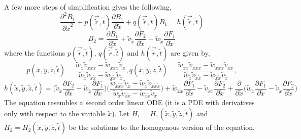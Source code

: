\documentclass{article}
\begin{document}
A few more steps of simplification gives the following,
\begin{equation} \label{eqn38}
\frac{\partial^2 B_1}{\partial \tilde{x}^2} + p(\vec{\tilde{r}}, \tilde{t}) \frac{\partial B_1}{\partial \tilde{x}} + q(\vec{\tilde{r}}, \tilde{t}) B_1 = h(\vec{\tilde{r}}, \tilde{t})
\end{equation}
\begin{equation} \label{eqn41}
B_2 = \frac{\partial B_1}{\partial \tilde{x}} + \tilde{v}_{\tilde{x}} \frac{\partial F_2}{\partial \tilde{x}} - \tilde{w}_{\tilde{x}} \frac{\partial F_1}{\partial \tilde{x}}
\end{equation}
where the functions $p(\vec{\tilde{r}}, \tilde{t})$, $q(\vec{\tilde{r}}, \tilde{t})$ and $h(\vec{\tilde{r}}, \tilde{t})$ are given by,
\begin{equation*}
p(\tilde{x}, \tilde{y}, \tilde{z}, \tilde{t}) = \frac{\tilde{w}_{\tilde{x}} \tilde{v}_{\tilde{x}\tilde{x}\tilde{x}} - \tilde{w}_{\tilde{x}\tilde{x}\tilde{x}} \tilde{v}_{\tilde{x}}}{\tilde{w}_{\tilde{x}}\tilde{v}_{\tilde{x}\tilde{x}}-\tilde{w}_{\tilde{x}\tilde{x}}\tilde{v}_{\tilde{x}}},
q(\tilde{x}, \tilde{y}, \tilde{z}, \tilde{t}) = \frac{\tilde{w}_{\tilde{x}\tilde{x}} \tilde{v}_{\tilde{x}\tilde{x}\tilde{x}} - \tilde{w}_{\tilde{x}\tilde{x}\tilde{x}} \tilde{v}_{\tilde{x}\tilde{x}}}{\tilde{w}_{\tilde{x}}\tilde{v}_{\tilde{x}\tilde{x}}-\tilde{w}_{\tilde{x}\tilde{x}}\tilde{v}_{\tilde{x}}},
\end{equation*}
\begin{equation*}
h(\tilde{x}, \tilde{y}, \tilde{z}, \tilde{t}) = \bigg(\tilde{v}_{\tilde{x}} \frac{\partial F_2}{\partial \tilde{x}} - \tilde{w}_{\tilde{x}} \frac{\partial F_1}{\partial \tilde{x}}\bigg)\bigg(\frac{\tilde{w}_{\tilde{x}\tilde{x}\tilde{x}}\tilde{v}_{\tilde{x}}-\tilde{w}_{\tilde{x}}\tilde{v}_{\tilde{x}\tilde{x}\tilde{x}}}{\tilde{w}_{\tilde{x}} \tilde{v}_{\tilde{x}\tilde{x}} - \tilde{w}_{\tilde{x}\tilde{x}}\tilde{v}_{\tilde{x}}}\bigg) + \tilde{w}_{\tilde{x}\tilde{x}} \frac{\partial F_1}{\partial \tilde{x}} - \tilde{v}_{\tilde{x}\tilde{x}} \frac{\partial F_2}{\partial \tilde{x}} + \frac{\partial}{\partial\tilde{x}}\bigg(\tilde{w}_{\tilde{x}} \frac{\partial F_1}{\partial \tilde{x}} - \tilde{v}_{\tilde{x}} \frac{\partial F_2}{\partial \tilde{x}}\bigg)
\end{equation*}
The equation resembles a second order linear ODE (it is a PDE with derivatives only with respect to the variable $\tilde{x}$). Let $H_1 = H_1(\tilde{x}, \tilde{y}, \tilde{z}, \tilde{t})$ and $H_2 = H_2(\tilde{x}, \tilde{y}, \tilde{z}, \tilde{t})$ be the solutions to the homogenous version of the equation,
\end{document}
